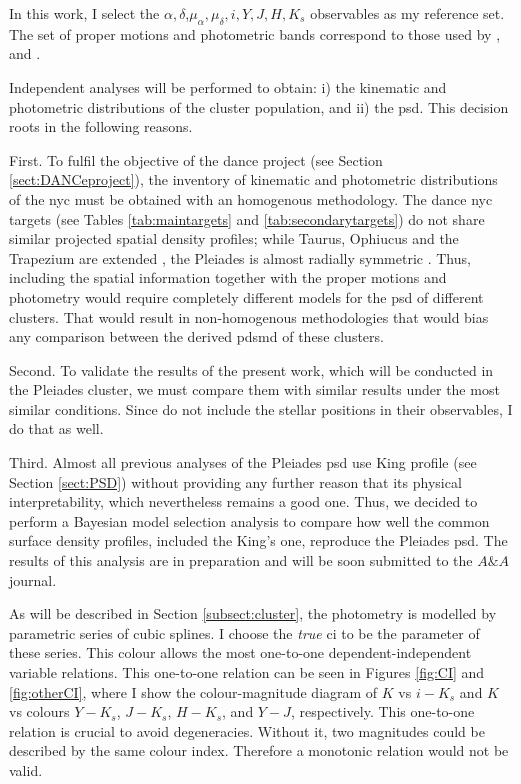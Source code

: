 {In this work, I select the $\alpha,\delta$,$\mu_{\alpha},\mu_{\delta},i,Y,J,H,K_s$ observables as my reference set. The set of proper motions and photometric bands correspond to those used by \citet{Sarro2014}, and \citet{Bouy2015}. }
 
{Independent analyses will be performed to obtain: i) the kinematic and photometric distributions of the cluster population, and ii) the \gls{psd}. This decision roots in the following reasons. }

First. To fulfil the objective of the \gls{dance} project (see Section \ref{sect:DANCeproject}), the inventory of kinematic and photometric distributions of the \gls{nyc} must be obtained with an homogenous methodology. The \gls{dance} \gls{nyc} targets (see Tables \ref{tab:maintargets} and \ref{tab:secondarytargets}) do not share similar projected spatial density profiles; while Taurus, Ophiucus and the Trapezium are extended \cite[see for example][]{simon1997}, the Pleiades is almost radially symmetric \citep{Raboud1998}. Thus, including the spatial information together with the proper motions and photometry would require completely different models for the \gls{psd} of different clusters. That would result in non-homogenous methodologies that would bias any comparison between the derived \gls{pdsmd} of these clusters.

{Second. To validate the results of the present work, which will be conducted in the Pleiades cluster, we must compare them with similar results under the most similar conditions. Since \citet{Bouy2015,Sarro2014} do not include the stellar positions in their observables, I do that as well. }

{Third. Almost all previous analyses of the Pleiades \gls{psd} use King profile (see Section \ref{sect:PSD}) without providing any further reason that its physical interpretability, which nevertheless remains a good one. Thus, we decided to perform a Bayesian model selection analysis to compare how well the common surface density profiles, included the King's one, reproduce the Pleiades \gls{psd}. The results of this analysis are in preparation and will be soon submitted to the $A\&A$ journal. }

As will be described in Section \ref{subsect:cluster}, the photometry is modelled by parametric series of cubic splines. I choose the \emph{true} \gls{ci} to be the parameter of these series. This colour allows the most one-to-one dependent-independent variable relations. This one-to-one relation can be seen in Figures \ref{fig:CI} and \ref{fig:otherCI}, where I show the colour-magnitude diagram of $K$ vs $i-K_s$ and $K$ vs colours $Y-K_s$, $J-K_s$, $H-K_s$, and $Y-J$, respectively.  This one-to-one relation is crucial to avoid degeneracies. Without it, two magnitudes could be described by the same colour index. Therefore a monotonic relation would not be valid. 

